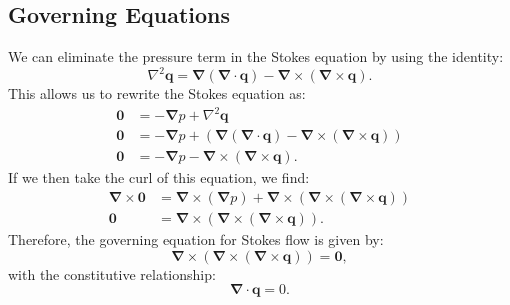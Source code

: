 \documentclass{article}
\theoremstyle{definition}
\begin{document}
\subsection{Governing Equations}
We can eliminate the pressure term in the Stokes equation by using the
identity:
\begin{equation*}
    \nabla^2 \symbf{q} = \symbf{\nabla} \left( \symbf{\nabla} \cdot \symbf{q} \right) - \symbf{\nabla} \times \left( \symbf{\nabla} \times \symbf{q} \right).
\end{equation*}
This allows us to rewrite the Stokes equation as:
\begin{align*}
    \symbf{0} & = -\symbf{\nabla} p + \nabla^2 \symbf{q}                                                                                                                                 \\
    \symbf{0} & = -\symbf{\nabla} p + \left( \symbf{\nabla} \left( \symbf{\nabla} \cdot \symbf{q} \right) - \symbf{\nabla} \times \left( \symbf{\nabla} \times \symbf{q} \right) \right) \\
    \symbf{0} & = -\symbf{\nabla} p - \symbf{\nabla} \times \left( \symbf{\nabla} \times \symbf{q} \right).
\end{align*}
If we then take the curl of this equation, we find:
\begin{align*}
    \symbf{\nabla} \times \symbf{0} & = \symbf{\nabla} \times \left( \symbf{\nabla} p \right) + \symbf{\nabla} \times \left( \symbf{\nabla} \times \left( \symbf{\nabla} \times \symbf{q} \right) \right) \\
    \symbf{0}                       & = \symbf{\nabla} \times \left( \symbf{\nabla} \times \left( \symbf{\nabla} \times \symbf{q} \right) \right).
\end{align*}
Therefore, the governing equation for Stokes flow is given by:
\begin{equation*}
    \symbf{\nabla} \times \left( \symbf{\nabla} \times \left( \symbf{\nabla} \times \symbf{q} \right) \right) = \symbf{0},
\end{equation*}
with the constitutive relationship:
\begin{equation*}
    \symbf{\nabla} \cdot \symbf{q} = 0.
\end{equation*}
\end{document}
